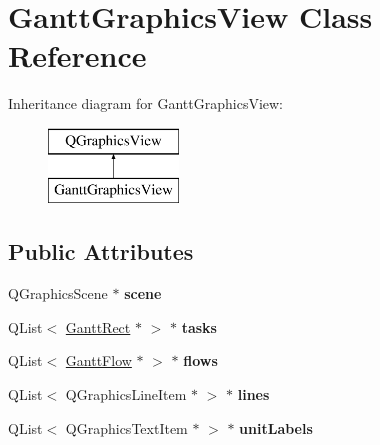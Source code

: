 \hypertarget{class_gantt_graphics_view}{}\section{Gantt\+Graphics\+View Class Reference}
\label{class_gantt_graphics_view}
Inheritance diagram for Gantt\+Graphics\+View\+:\begin{figure}[H]
\begin{center}
\leavevmode
\includegraphics[height=2.000000cm]{class_gantt_graphics_view}
\end{center}
\end{figure}
\subsection*{Public Attributes}
\begin{DoxyCompactItemize}
\item 
\hypertarget{class_gantt_graphics_view_a9f75c7c70ff0f5ed86851b2568e0761f}{}Q\+Graphics\+Scene $\ast$ {\bfseries scene}\label{class_gantt_graphics_view_a9f75c7c70ff0f5ed86851b2568e0761f}

\item 
\hypertarget{class_gantt_graphics_view_a4bdcbe149a72ebf613c3b20194af1177}{}Q\+List$<$ \hyperlink{class_gantt_rect}{Gantt\+Rect} $\ast$ $>$ $\ast$ {\bfseries tasks}\label{class_gantt_graphics_view_a4bdcbe149a72ebf613c3b20194af1177}

\item 
\hypertarget{class_gantt_graphics_view_a1b2317941c3cc0d46f487150f9a23345}{}Q\+List$<$ \hyperlink{class_gantt_flow}{Gantt\+Flow} $\ast$ $>$ $\ast$ {\bfseries flows}\label{class_gantt_graphics_view_a1b2317941c3cc0d46f487150f9a23345}

\item 
\hypertarget{class_gantt_graphics_view_a024da97a8f64fe1a93ac8f66ebd0c509}{}Q\+List$<$ Q\+Graphics\+Line\+Item $\ast$ $>$ $\ast$ {\bfseries lines}\label{class_gantt_graphics_view_a024da97a8f64fe1a93ac8f66ebd0c509}

\item 
\hypertarget{class_gantt_graphics_view_a0c9e18df143ee370ef16ad191ec89243}{}Q\+List$<$ Q\+Graphics\+Text\+Item $\ast$ $>$ $\ast$ {\bfseries unit\+Labels}\label{class_gantt_graphics_view_a0c9e18df143ee370ef16ad191ec89243}

\end{DoxyCompactItemize}
